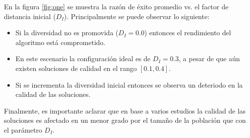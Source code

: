 En la figura \ref{fig:one} se muestra la razón de éxito promedio vs. el factor de distancia inicial ($D_I$).
%
Principalmente se puede observar lo siguiente:
\begin{itemize}
\item Si la diversidad no es promovida ($D_I=0.0$) entonces el rendimiento del algoritmo está comprometido.
\item En este escenario la configuración ideal es de $D_I=0.3$, a pesar de que aún existen soluciones de calidad en el rango $[0.1, 0.4]$.
\item Si se incrementa la diversidad inicial entonces se observa un deteriodo en la calidad de las soluciones.
\end{itemize}
Finalmente, es importante aclarar que en base a varios estudios la calidad de las soluciones es afectado en un menor grado por el tamaño de la población que con el parámetro $D_I$.
%
%

